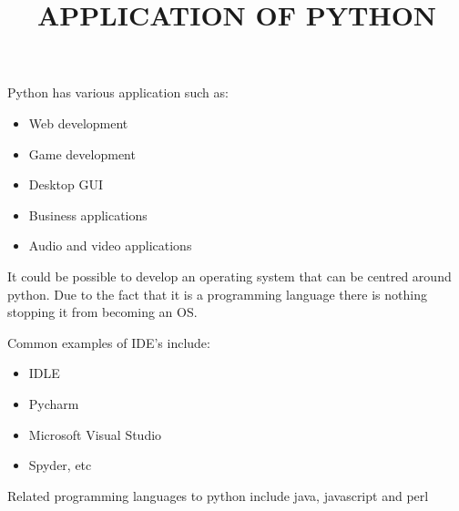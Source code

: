 \documentclass{article}
\title{APPLICATION OF PYTHON}
\begin{document}
	Python has various application such as:
	\begin{itemize}
		\item Web development
		\item Game development
		\item Desktop GUI
		\item Business applications
		\item Audio and video applications
		\end{itemize}
	
	It could be possible to develop an operating system that can be centred around python. Due to the fact that it is a programming language there is nothing stopping it from becoming an OS.
	
	
	
	Common examples of IDE's include:
	\begin{itemize}
		\item IDLE
		\item Pycharm
		\item Microsoft Visual Studio
		\item Spyder, etc
	\end{itemize}

Related programming languages to python include java, javascript and perl
\end{document}

